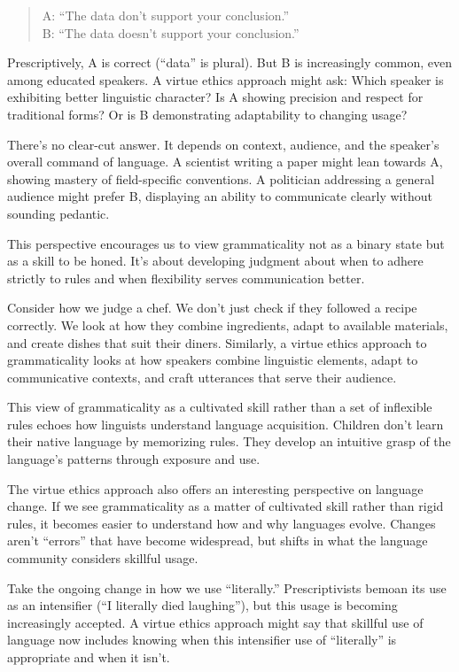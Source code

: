 \begin{quote}
A: ``The data don't support your conclusion.''\\
B: ``The data doesn't support your conclusion.''
\end{quote}

Prescriptively, A is correct (``data'' is plural). But B is increasingly common, even among educated speakers. A virtue ethics approach might ask: Which speaker is exhibiting better linguistic character? Is A showing precision and respect for traditional forms? Or is B demonstrating adaptability to changing usage?

There's no clear-cut answer. It depends on context, audience, and the speaker's overall command of language. A scientist writing a paper might lean towards A, showing mastery of field-specific conventions. A politician addressing a general audience might prefer B, displaying an ability to communicate clearly without sounding pedantic.

This perspective encourages us to view grammaticality not as a binary state but as a skill to be honed. It's about developing judgment about when to adhere strictly to rules and when flexibility serves communication better.

Consider how we judge a chef. We don't just check if they followed a recipe correctly. We look at how they combine ingredients, adapt to available materials, and create dishes that suit their diners. Similarly, a virtue ethics approach to grammaticality looks at how speakers combine linguistic elements, adapt to communicative contexts, and craft utterances that serve their audience.

This view of grammaticality as a cultivated skill rather than a set of inflexible rules echoes how linguists understand language acquisition. Children don't learn their native language by memorizing rules. They develop an intuitive grasp of the language's patterns through exposure and use.

The virtue ethics approach also offers an interesting perspective on language change. If we see grammaticality as a matter of cultivated skill rather than rigid rules, it becomes easier to understand how and why languages evolve. Changes aren't ``errors'' that have become widespread, but shifts in what the language community considers skillful usage.

Take the ongoing change in how we use ``literally.'' Prescriptivists bemoan its use as an intensifier (``I literally died laughing''), but this usage is becoming increasingly accepted. A virtue ethics approach might say that skillful use of language now includes knowing when this intensifier use of ``literally'' is appropriate and when it isn't.

